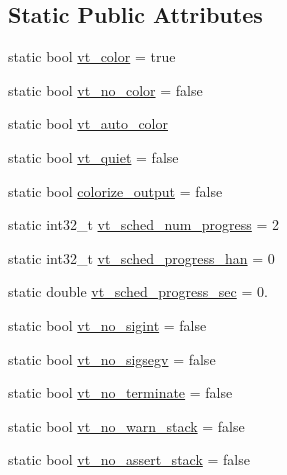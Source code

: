\subsection*{Static Public Attributes}
\begin{DoxyCompactItemize}
\item 
static bool \hyperlink{structvt_1_1arguments_1_1_arg_config_aa1298b5dcba576da489b54d26ae09de9}{vt\+\_\+color} = true
\item 
static bool \hyperlink{structvt_1_1arguments_1_1_arg_config_a7b6f18a60a05a84f99852904088f499d}{vt\+\_\+no\+\_\+color} = false
\item 
static bool \hyperlink{structvt_1_1arguments_1_1_arg_config_a5fe8777bbb7c249f7549398cea5aacdc}{vt\+\_\+auto\+\_\+color}
\item 
static bool \hyperlink{structvt_1_1arguments_1_1_arg_config_ace1478026a995a0ffd075827ce9f985c}{vt\+\_\+quiet} = false
\item 
static bool \hyperlink{structvt_1_1arguments_1_1_arg_config_a98e91ff747e85c52700f8ddb410fabb7}{colorize\+\_\+output} = false
\item 
static int32\+\_\+t \hyperlink{structvt_1_1arguments_1_1_arg_config_af4959df3d7d424015e14861cb43362af}{vt\+\_\+sched\+\_\+num\+\_\+progress} = 2
\item 
static int32\+\_\+t \hyperlink{structvt_1_1arguments_1_1_arg_config_ab021f71bb3d93628d874b51b94f8364c}{vt\+\_\+sched\+\_\+progress\+\_\+han} = 0
\item 
static double \hyperlink{structvt_1_1arguments_1_1_arg_config_a247f2f58ded7742c4b433646a53139ac}{vt\+\_\+sched\+\_\+progress\+\_\+sec} = 0.
\item 
static bool \hyperlink{structvt_1_1arguments_1_1_arg_config_ad8eeabd4e783774894d21055fc3986b3}{vt\+\_\+no\+\_\+sigint} = false
\item 
static bool \hyperlink{structvt_1_1arguments_1_1_arg_config_ae657e6a5c890a0822958ccb6ff670159}{vt\+\_\+no\+\_\+sigsegv} = false
\item 
static bool \hyperlink{structvt_1_1arguments_1_1_arg_config_ae2fe8d151f382e70483f33c24c4fae2e}{vt\+\_\+no\+\_\+terminate} = false
\item 
static bool \hyperlink{structvt_1_1arguments_1_1_arg_config_a16f70ff1b626b624e04d21e87a5b08ee}{vt\+\_\+no\+\_\+warn\+\_\+stack} = false
\item 
static bool \hyperlink{structvt_1_1arguments_1_1_arg_config_a21cfd06769807c11dad7729874c11dc4}{vt\+\_\+no\+\_\+assert\+\_\+stack} = false
\item 

\end{DoxyCompactItemize}

